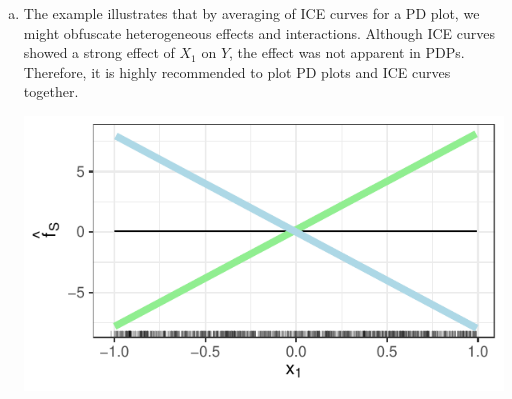 {\begin{enumerate} [a)]
  The lightgreen dots correspond to group $X_2 = 1$, the lightblue dots to group $X_2 = 0$.
  
   \item The example illustrates that by averaging of ICE curves for a PD plot, 
   we might obfuscate heterogeneous effects and interactions. 
   Although ICE curves showed a strong effect of $X_1$ on $Y$, the effect was not 
   apparent in PDPs.
   Therefore, it is highly recommended to plot PD plots and ICE curves together. 

\begin{center}
  \includegraphics[width=\maxwidth]{figure/pdpinteraction_ICE_curve_sol.pdf}
\end{center}

  
\end{enumerate}
}